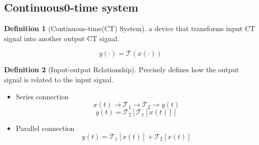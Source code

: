 \documentclass{article}
\theoremstyle{definition}
\newtheorem{definition}{Definition}[subsection]
\begin{document}
\subsection{Continuous0-time system}
\begin{definition}[Continuous-time(CT) System]
    a device that transforms input CT signal into another output CT signal.
\end{definition}
\begin{equation}
    y(\cdot) = \mathcal{T}(x(\cdot))
\end{equation}
\begin{definition}[Input-output Relationship]
    Precisely defines how the output signal is related to the input signal.
\end{definition}
\begin{itemize}
    \item Series connection
        \begin{equation}
            x(t)\rightarrow \boxed{\mathcal{T}_1}\rightarrow \boxed{\mathcal{T}_2} \rightarrow y(t)
        \end{equation}
        \begin{equation}
            y(t)=\mathcal{T}_2[\mathcal{T}_1[x(t)]]
        \end{equation}
    \item Parallel connection
        \begin{equation}
            y(t)=\mathcal{T}_1[x(t)]+\mathcal{T}_2[x(t)]
        \end{equation}
\end{itemize}
\end{document}
